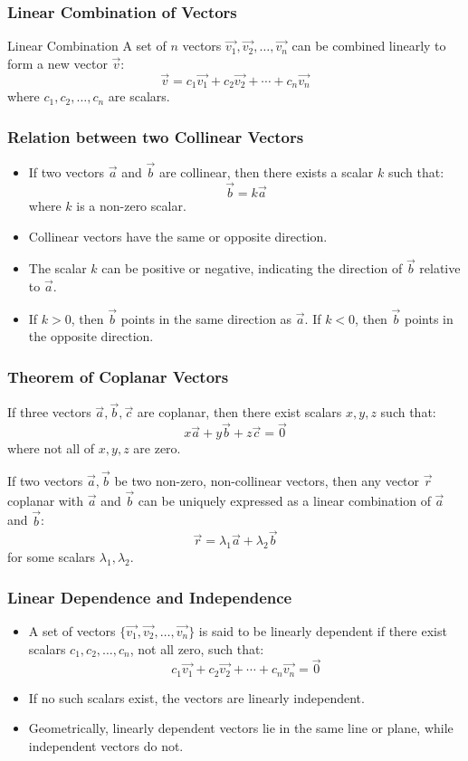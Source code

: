\begin{frame}
\frametitle{Linear Combination of Vectors}
\begin{block}{Linear Combination}
A set of \(n\) vectors \(\vec{v_1}, \vec{v_2}, \ldots, \vec{v_n}\) can be combined linearly to form a new vector \(\vec{v}\):
\[
\vec{v} = c_1 \vec{v_1} + c_2 \vec{v_2} + \cdots + c_n \vec{v_n}
\]
where \(c_1, c_2, \ldots, c_n\) are scalars.
\end{block}
\end{frame}

\begin{frame}
    \frametitle{Relation between two Collinear Vectors}
    \begin{itemize}
        \item If two vectors \(\vec{a}\) and \(\vec{b}\) are collinear, then there exists a scalar \(k\) such that:
        \[
        \vec{b} = k \vec{a}
        \]
        where \(k\) is a non-zero scalar.
        \item Collinear vectors have the same or opposite direction.
        \item The scalar \(k\) can be positive or negative, indicating the direction of \(\vec{b}\) relative to \(\vec{a}\).
        \item If \(k > 0\), then \(\vec{b}\) points in the same direction as \(\vec{a}\). If \(k < 0\), then \(\vec{b}\) points in the opposite direction.
    \end{itemize}
\end{frame}

\begin{frame}
    \frametitle{Theorem of Coplanar Vectors}

    If three vectors \(\vec{a}, \vec{b}, \vec{c}\) are coplanar, then there exist scalars \(x, y, z\) such that:
    \[
    x \vec{a} + y \vec{b} + z \vec{c} = \vec{0}
    \]
    where not all of \(x, y, z\) are zero.      

    If two vectors \(\vec{a}, \vec{b}\) be two non-zero, non-collinear vectors, then any vector \(\vec{r}\) coplanar with \(\vec{a}\) and \(\vec{b}\) can be uniquely expressed as a linear combination of \(\vec{a}\) and \(\vec{b}\):
    \[
    \vec{r} = \lambda_1 \vec{a} + \lambda_2 \vec{b}
    \]
    for some scalars \(\lambda_1, \lambda_2\).

\end{frame}

\begin{frame}
\frametitle{Linear Dependence and Independence}
\begin{itemize}
    \item A set of vectors \(\{\vec{v_1}, \vec{v_2}, \ldots, \vec{v_n}\}\) is said to be linearly dependent if there exist scalars \(c_1, c_2, \ldots, c_n\), not all zero, such that:
    \[
    c_1 \vec{v_1} + c_2 \vec{v_2} + \cdots + c_n \vec{v_n} = \vec{0}
    \]
    \item If no such scalars exist, the vectors are linearly independent.
    \item Geometrically, linearly dependent vectors lie in the same line or plane, while independent vectors do not.
\end{itemize}                   
\end{frame}

